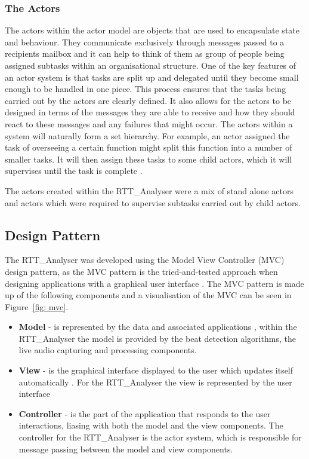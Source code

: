 \documentclass[a4paper, 11pt]{article}
\begin{document}
\subsubsection{The Actors}
The actors within the actor model are objects that are used to encapsulate state and behaviour. They communicate exclusively through messages passed to a recipients mailbox and it can help to think of them as group of people being assigned subtasks within an organisational structure. One of the key features of an actor system is that tasks are split up and delegated until they become small enough to be handled in one piece. This process ensures that the tasks being carried out by the actors are clearly defined. It also allows for the actors to be designed in terms of the messages they are able to receive and how they should react to these messages and any failures that might occur. The actors within a system will naturally form a set hierarchy. For example, an actor assigned the task of overseeing a certain function might split this function into a number of smaller tasks. It will then assign these tasks to some child actors, which it will supervises until the task is complete \cite{acotrsys}.\par 

The actors created within the RTT\_Analyser were a mix of stand alone actors and actors which were required to supervise subtasks carried out by child actors.

\subsection{Design Pattern}
The RTT\_Analyser was developed using the Model View Controller (MVC) design pattern, as the MVC pattern is the tried-and-tested approach when designing applications with a graphical user interface \cite{designPatterns}. The MVC pattern is made up of the following components and a visualisation of the MVC can be seen in Figure~\ref{fig: mvc}. 

\begin{itemize}
\item \textbf{Model} - is represented by the data and associated applications \cite{designPatterns}, within the RTT\_Analyser the model is provided by the beat detection algorithms, the live audio capturing and processing components.\\
\item \textbf{View} - is the graphical interface displayed to the user which updates itself automatically \cite{designPatterns}. For the RTT\_Analyser the view is represented by the user interface\\
\item \textbf{Controller} - is the part of the application that responds to the user interactions, liasing with both the model and the view components\cite{designPatterns}. The controller for the RTT\_Analyser is the actor system, which is responsible for message passing between the model and view components.
\end{itemize}
\end{document}

